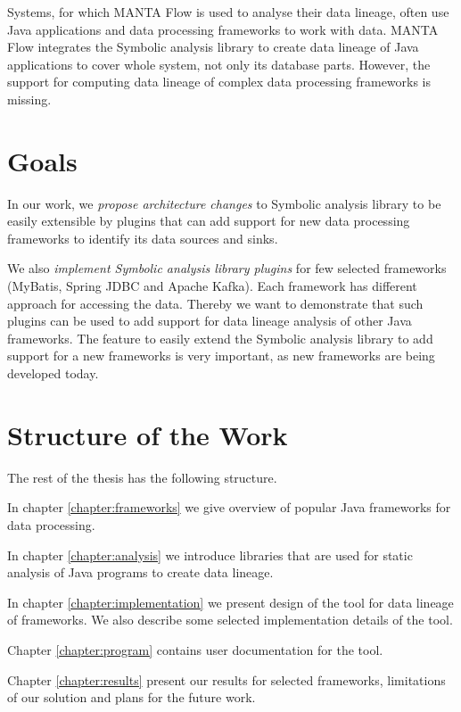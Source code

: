 Systems, for which MANTA Flow is used to analyse their data lineage,
often use Java applications and data processing frameworks to work with data.
MANTA Flow integrates the Symbolic analysis library to create data lineage of
Java applications to cover whole system, not only its database parts.
However, the support for computing data lineage of complex data processing frameworks
is missing.




\section{Goals}

In our work, we \textit{propose architecture changes} to Symbolic analysis library
to be easily extensible by plugins that can add support for new data processing frameworks
to identify its data sources and sinks.

We also \textit{implement Symbolic analysis library plugins} for few selected frameworks
(MyBatis, Spring JDBC and Apache Kafka).
Each framework has different approach for accessing the data.
Thereby we want to demonstrate that such plugins can be used to
add support for data lineage analysis of other Java frameworks.
The feature to easily extend the Symbolic analysis library to add support for a new frameworks
is very important, as new frameworks are being developed today.




\section{Structure of the Work}

The rest of the thesis has the following structure.

In chapter \ref{chapter:frameworks} we give overview of popular Java frameworks
for data processing.

In chapter \ref{chapter:analysis} we introduce libraries that are used
for static analysis of Java programs to create data lineage.

In chapter \ref{chapter:implementation} we present design of the \ToolName tool for
data lineage of frameworks. We also describe some selected implementation details of the tool.

Chapter \ref{chapter:program} contains user documentation for the \ToolName tool.

Chapter \ref{chapter:results} present our results for selected frameworks,
limitations of our solution and plans for the future work.

